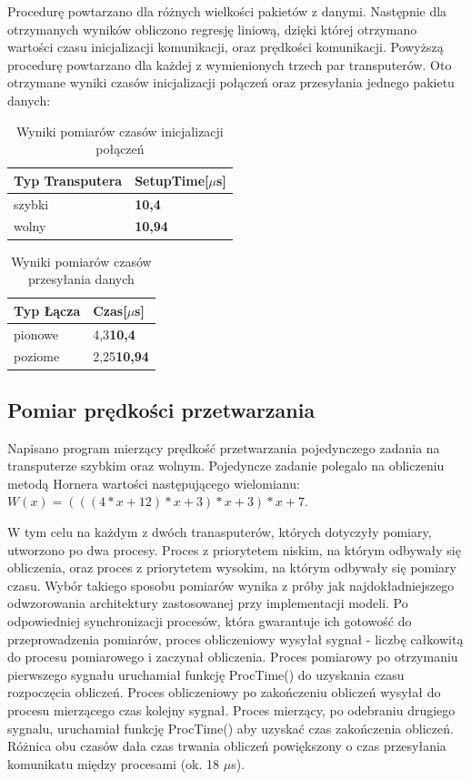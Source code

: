 \documentclass[a4paper,11pt, titlepage]{article}
\begin{document}
Procedurę powtarzano dla różnych wielkości pakietów z danymi. Następnie dla otrzymanych wyników obliczono regresję liniową, dzięki której otrzymano wartości czasu inicjalizacji komunikacji, oraz prędkości komunikacji. Powyższą procedurę powtarzano dla każdej z wymienionych trzech par transputerów. Oto otrzymane wyniki czasów inicjalizacji połączeń oraz przesyłania jednego pakietu danych:
\begin{table}[h!]
\begin{tabular}{|l|l|}\hline
Typ Transputera & SetupTime[$\mu$s]\\ \hline
szybki & \textbf{10,4}\\ \hline
wolny & \textbf{10,94}\\ \hline
\end{tabular}
\caption{Wyniki pomiarów czasów inicjalizacji połączeń \label{setuptime}}
\end{table}

\begin{table}[h!]
\begin{tabular}{|l|l|}\hline
Typ Łącza & Czas[$\mu$s]\\ \hline
pionowe & 4,3\textbf{10,4}\\ \hline
poziome & 2,25\textbf{10,94}\\ \hline
\end{tabular}
\caption{Wyniki pomiarów czasów przesyłania danych \label{comunication}}
\end{table}

\subsection{Pomiar prędkości przetwarzania}
Napisano program mierzący prędkość przetwarzania pojedynczego zadania na transputerze szybkim oraz wolnym. Pojedyncze zadanie polegalo na obliczeniu metodą Hornera wartości następującego wielomianu: $W(x) = (((4*x+12)*x+3)*x+3)*x+7$.

W tym celu na każdym z dwóch tranasputerów, których dotyczyły pomiary, utworzono po dwa procesy. Proces z priorytetem niskim, na którym odbywały się obliczenia, oraz proces z priorytetem wysokim, na którym odbywały się pomiary czasu. Wybór takiego sposobu pomiarów wynika z próby jak najdokładniejszego odwzorowania architektury zastosowanej przy implementacji modeli. Po odpowiedniej synchronizacji procesów, która gwarantuje ich gotowość do przeprowadzenia pomiarów, proces obliczeniowy wysyłał sygnał - liczbę całkowitą do procesu pomiarowego i zaczynał obliczenia.  Proces pomiarowy po otrzymaniu pierwszego sygnału uruchamiał funkcję ProcTime() do uzyskania czasu rozpoczęcia obliczeń. Proces obliczeniowy po zakończeniu obliczeń wysyłał do procesu mierzącego czas kolejny sygnał. Proces mierzący, po odebraniu drugiego sygnalu, uruchamiał funkcję ProcTime() aby uzyskać czas zakończenia obliczeń. Różnica obu czasów dała czas trwania obliczeń powiększony o czas przesyłania komunikatu między procesami (ok. 18 $\mu$s). 
\end{document}

